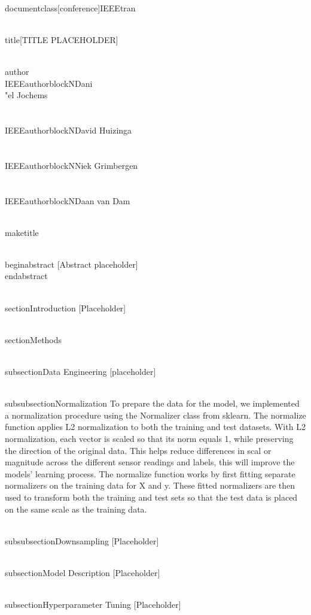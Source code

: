 \\documentclass[conference]{IEEEtran}
\begin{document}
\\title{[TITLE PLACEHOLDER]}

\\author{\\IEEEauthorblockN{Dani\\"el Jochems} \\\\ 
\\IEEEauthorblockN{David Huizinga} \\\\ 
\\IEEEauthorblockN{Niek Grimbergen} \\\\ 
\\IEEEauthorblockN{Daan van Dam}}

\\maketitle

\\begin{abstract}
[Abstract placeholder]
\\end{abstract}

\\section{Introduction}
[Placeholder]

\\section{Methods}

\\subsection{Data Engineering}
[placeholder]

\\subsubsection{Normalization}
To prepare the data for the model, we implemented a normalization procedure using the Normalizer class from sklearn. The normalize function applies L2 normalization to both the training and test datasets. With L2 normalization, each vector is scaled so that its norm equals 1, while preserving the direction of the original data. This helps reduce differences in scal or magnitude across the different sensor readings and labels, this will improve the models’ learning process. The normalize function works by first fitting separate normalizers on the training data for X and y. These fitted normalizers are then used to transform both the training and test sets so that the test data is placed on the same scale as the training data.

\\subsubsection{Downsampling}
[Placeholder]

\\subsection{Model Description}
[Placeholder]

\\subsection{Hyperparameter Tuning}
[Placeholder]
\end{document}
